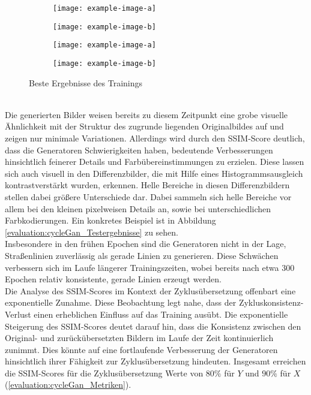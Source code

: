 \begin{figure}
  \medskip

  \begin{subfigure}[t]{.2\textwidth}
    \centering
    \texttt{[image: example-image-a]}
  \end{subfigure}
  \begin{subfigure}[t]{.2\textwidth}
    \centering
    \texttt{[image: example-image-b]}
  \end{subfigure}
  \hfill
  \begin{subfigure}[t]{.2\textwidth}
    \centering
    \texttt{[image: example-image-a]}
  \end{subfigure}
  \begin{subfigure}[t]{.2\textwidth}
    \centering
    \texttt{[image: example-image-b]}
  \end{subfigure}
  \caption{Beste Ergebnisse des Trainings}

\end{figure}

\\\newline
Die generierten Bilder weisen bereits zu diesem Zeitpunkt eine grobe visuelle Ähnlichkeit mit der Struktur des zugrunde liegenden Originalbildes auf und zeigen nur minimale Variationen. Allerdings wird durch den SSIM-Score deutlich, dass die Generatoren Schwierigkeiten haben, bedeutende Verbesserungen hinsichtlich feinerer Details und Farbübereinstimmungen zu erzielen. Diese lassen sich auch visuell in den Differenzbilder, die mit Hilfe eines Histogrammsausgleich kontrastverstärkt wurden, erkennen. Helle Bereiche in diesen Differenzbildern stellen dabei größere Unterschiede dar. Dabei sammeln sich helle Bereiche vor allem bei den kleinen pixelweisen Details an, sowie bei unterschiedlichen Farbkodierungen. Ein konkretes Beispiel ist in Abbildung \ref{evaluation:cycleGan_Testergebnisse} zu sehen.
\\
Insbesondere in den frühen Epochen sind die Generatoren nicht in der Lage, Straßenlinien zuverlässig als gerade Linien zu generieren. Diese Schwächen verbessern sich im Laufe längerer Trainingszeiten, wobei bereits nach etwa 300 Epochen relativ konsistente, gerade Linien erzeugt werden.
\\\newline
Die Analyse des SSIM-Scores im Kontext der Zyklusübersetzung offenbart eine exponentielle Zunahme. Diese Beobachtung legt nahe, dass der Zykluskonsistenz-Verlust einen erheblichen Einfluss auf das Training ausübt. Die exponentielle Steigerung des SSIM-Scores deutet darauf hin, dass die Konsistenz zwischen den Original- und zurückübersetzten Bildern im Laufe der Zeit kontinuierlich zunimmt. Dies könnte auf eine fortlaufende Verbesserung der Generatoren hinsichtlich ihrer Fähigkeit zur Zyklusübersetzung hindeuten. Insgesamt erreichen die SSIM-Scores für die Zyklusübersetzung Werte von $80\%$ für $Y$ und $90\%$ für $X$ (\ref{evaluation:cycleGan_Metriken}).

